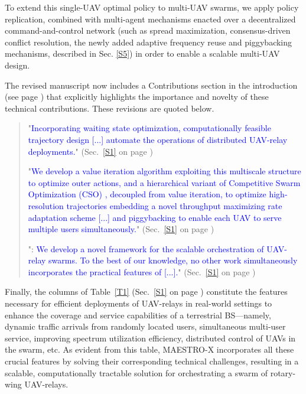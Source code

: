 \documentclass[12pt, draftcls, onecolumn]{IEEEtran}
\theoremstyle{plain}
\theoremstyle{definition}
\theoremstyle{remark}
\newcommand\hlt[1]{\textcolor{blue}{#1}}
\begin{document}
\begin{enumerate}
    To extend this single-UAV optimal policy to multi-UAV swarms, we apply policy replication, combined with multi-agent mechanisms enacted over a decentralized command-and-control network (such as spread maximization, consensus-driven conflict resolution, the newly added adaptive frequency reuse and piggybacking mechanisms, described in Sec. \ref{S5}) in order to enable a scalable multi-UAV design. 
    \vspace{2mm}


The revised manuscript now includes a Contributions section in the introduction (see page \pageref{contrib_subs}) that explicitly highlights the importance and novelty of these technical contributions.
These revisions are quoted below.

    \begin{quote}
        "\hlt{Incorporating waiting state optimization, computationally feasible trajectory design [...] automate the operations of distributed UAV-relay deployments.}" (Sec.~\ref{S1} on page \pageref{S1})
        \vspace{1mm}
        
        "\hlt{We develop a value iteration algorithm \cite{Bertsekas} exploiting this multiscale structure to optimize outer actions, and a hierarchical variant of Competitive Swarm Optimization (CSO) \cite{CSO}, decoupled from value iteration, to optimize high-resolution trajectories embedding a novel throughput maximizing rate adaptation scheme [...] and piggybacking to enable each UAV to serve multiple users simultaneously.}" (Sec.~\ref{S1} on page \pageref{T1})
        \vspace{1mm}
        
        "\noindent{\hlt{\textbf{Contributions}}}: \hlt{We develop a novel framework for the scalable orchestration of UAV-relay swarms. To the best of our knowledge, no other work simultaneously incorporates the practical features of [...].}" (Sec.~\ref{S1} on page \pageref{contrib_subs})
    \end{quote}
    
    Finally, the columns of Table~\ref{T1} (Sec.~\ref{S1} on page \pageref{T1}) constitute the features necessary for efficient deployments of UAV-relays in real-world settings to enhance the coverage and service capabilities of a terrestrial BS---namely, dynamic traffic arrivals from randomly located users, simultaneous multi-user service, improving spectrum utilization efficiency, distributed control of UAVs in the swarm, etc. As evident from this table, MAESTRO-X incorporates all these crucial features by solving their corresponding technical challenges, resulting in a scalable, computationally tractable solution for orchestrating a swarm of rotary-wing UAV-relays.
    \vspace{4mm}
    

\end{enumerate}
\end{document}
